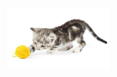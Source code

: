 \documentclass[hyperref]{beamer}
\begin{document}
\begin{frame}{}
\begin{center}
   \\
  \vspace{1cm}
  \includegraphics[width=3cm]{../img/yarn-cat.jpg}
\end{center}
\end{frame}



%
\end{document}
